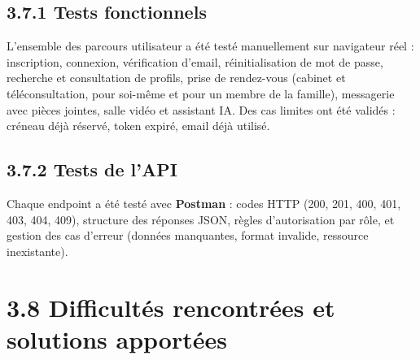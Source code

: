 \documentclass[12pt,a4paper]{report}
\begin{document}
\subsection*{3.7.1 Tests fonctionnels}

L'ensemble des parcours utilisateur a \'et\'e test\'e manuellement sur navigateur r\'eel : inscription, connexion, v\'erification d'email, r\'einitialisation de mot de passe, recherche et consultation de profils, prise de rendez-vous (cabinet et t\'el\'econsultation, pour soi-m\^eme et pour un membre de la famille), messagerie avec pi\`eces jointes, salle vid\'eo et assistant IA. Des cas limites ont \'et\'e valid\'es : cr\'eneau d\'ej\`a r\'eserv\'e, token expir\'e, email d\'ej\`a utilis\'e.

\subsection*{3.7.2 Tests de l'API}

Chaque endpoint a \'et\'e test\'e avec \textbf{Postman} : codes HTTP (200, 201, 400, 401, 403, 404, 409), structure des r\'eponses JSON, r\`egles d'autorisation par r\^ole, et gestion des cas d'erreur (donn\'ees manquantes, format invalide, ressource inexistante).

\section*{3.8 Difficult\'es rencontr\'ees et solutions apport\'ees}
\end{document}
